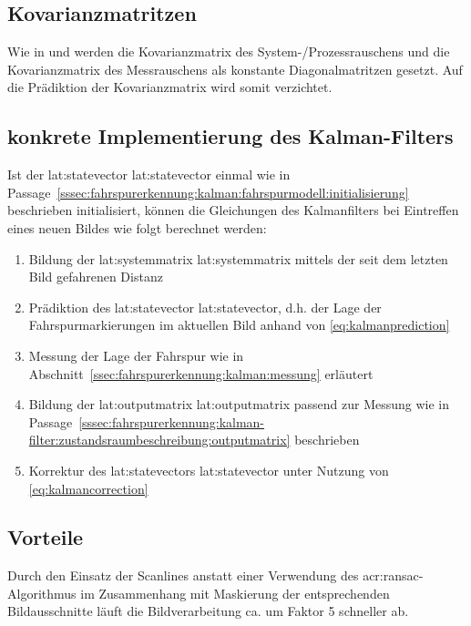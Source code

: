 \subsection{Kovarianzmatritzen}
Wie in \autocite{petersfalkoFPGAbasierteBildverarbeitungspipelineZur2009} und \autocite{risackRobustLaneRecognition1998} werden die Kovarianzmatrix des System-/Prozessrauschens  und die Kovarianzmatrix des Messrauschens  als konstante Diagonalmatritzen gesetzt. Auf die Prädiktion der Kovarianzmatrix  wird somit verzichtet.

\subsection{konkrete Implementierung des Kalman-Filters}
Ist der \glsdesc{lat:statevector} \gls{lat:statevector} einmal wie in Passage~\ref{sssec:fahrspurerkennung:kalman:fahrspurmodell:initialisierung} beschrieben initialisiert, können die Gleichungen des Kalmanfilters bei Eintreffen eines neuen Bildes wie folgt berechnet werden:
\begin{enumerate}
\item Bildung der \glsdesc{lat:systemmatrix} \gls{lat:systemmatrix} mittels der seit dem letzten Bild gefahrenen Distanz 
\item Prädiktion des \glsdesc{lat:statevector} \gls{lat:statevector}, d.h. der Lage der Fahrspurmarkierungen im aktuellen Bild anhand von \eqref{eq:kalmanprediction}
\item Messung der Lage der Fahrspur wie in Abschnitt~\ref{ssec:fahrspurerkennung:kalman:messung}
erläutert
\item Bildung der \glsdesc{lat:outputmatrix} \gls{lat:outputmatrix} passend zur Messung wie in Passage~\ref{sssec:fahrspurerkennung:kalman-filter:zustandsraumbeschreibung:outputmatrix} beschrieben
\item Korrektur des \glsdesc{lat:statevector}s \gls{lat:statevector} unter Nutzung von \eqref{eq:kalmancorrection}
\end{enumerate}

\subsection{Vorteile}
Durch den Einsatz der Scanlines anstatt einer Verwendung des \gls{acr:ransac}-Algorithmus im Zusammenhang mit Maskierung der entsprechenden Bildausschnitte läuft die Bildverarbeitung ca. um Faktor 5 schneller ab.

